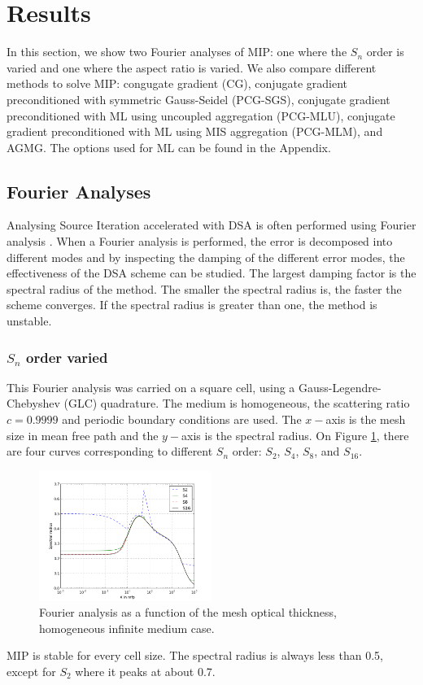 \section{Results} \label{sec_res}
In this section, we show two Fourier analyses of MIP: one where the $S_n$ order is
varied and one where the aspect ratio is varied. We also compare different
methods to solve MIP: congugate gradient (CG), conjugate gradient
preconditioned with symmetric Gauss-Seidel (PCG-SGS), conjugate gradient
preconditioned with ML using uncoupled aggregation (PCG-MLU),
conjugate gradient preconditioned with ML using MIS aggregation (PCG-MLM),
and AGMG. The options used for ML can be found in the Appendix.
\subsection{Fourier Analyses}
Analysing Source Iteration accelerated with DSA is often performed using
Fourier analysis \cite{larsen_dsa,consistent_p1}. When a Fourier analysis is
performed, the error is decomposed into different modes and by inspecting the 
damping of the different error modes, the effectiveness of the DSA scheme can 
be studied. The largest damping factor is the spectral radius of the method. 
The smaller the spectral radius is, the faster the scheme converges. If the 
spectral radius is greater than one, the method is unstable. 
\subsubsection{$S_n$ order varied}
This Fourier analysis was carried on a square cell, using a
Gauss-Legendre-Chebyshev (GLC) quadrature. The medium is homogeneous, the scattering
ratio $c=0.9999$ and periodic boundary conditions are used. The $x-$axis is the mesh
size in mean free path and the $y-$axis is the spectral radius. On Figure
\ref{fig_fa_op}, there are four curves corresponding to different $S_n$ order: 
$S_2$, $S_4$, $S_8$, and $S_{16}$.
\begin{figure}[H]
  \centering
  \includegraphics[width=0.5\textwidth]{./Dsa/sn_order_9999}
  \caption{Fourier analysis as a function of the mesh optical thickness,
  homogeneous infinite medium case.}
  \label{fig_fa_op}
\end{figure}
MIP is stable for every cell size. The spectral radius is always less than
0.5, except for $S_2$ where it peaks at about 0.7.
